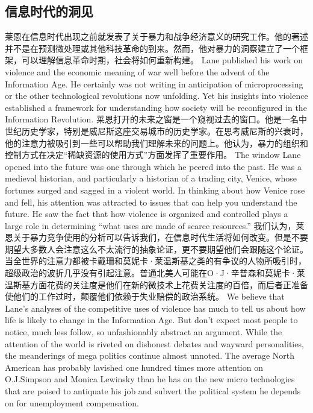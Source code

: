 \subsection{信息时代的洞见}
\begin{paracol}{2}
莱恩在信息时代出现之前就发表了关于暴力和战争经济意义的研究工作。他的著述并不是在预测微处理或其他科技革命的到来。然而，他对暴力的洞察建立了一个框架，可以理解信息革命时期，社会将如何重新构建。
\switchcolumn
Lane published his work on violence and the economic meaning of war well before the advent of the Information Age. He certainly was not writing in anticipation of microprocessing or the other technological revolutions now unfolding. Yet his insights into violence established a framework for understanding how society will be reconfigured in the Information Revolution.
\switchcolumn*
莱恩打开的未来之窗是一个窥视过去的窗口。他是一名中世纪历史学家，特别是威尼斯这座交易城市的历史学家。在思考威尼斯的兴衰时，他的注意力被吸引到一些可以帮助我们理解未来的问题上。他认为，暴力的组织和控制方式在决定“稀缺资源的使用方式”方面发挥了重要作用。
\switchcolumn
The window Lane opened into the future was one through which he peered into the past. He was a medieval historian, and particularly a historian of a trading city, Venice, whose fortunes surged and sagged in a violent world. In thinking about how Venice rose and fell, his attention was attracted to issues that can help you understand the future. He saw the fact that how violence is organized and controlled plays a large role in determining ``what uses are made of scarce resources.''
\switchcolumn*
我们认为，莱恩关于暴力竞争使用的分析可以告诉我们，在信息时代生活将如何改变。但是不要期望大多数人会注意这么不太流行的抽象论证，更不要期望他们会跟随这个论证。当全世界的注意力都被卡戴珊和莫妮卡·莱温斯基之类的有争议的人物所吸引时，超级政治的波折几乎没有引起注意。普通北美人可能在O·J·辛普森和莫妮卡·莱温斯基方面花费的关注度是他们在新的微技术上花费关注度的百倍，而后者正准备使他们的工作过时，颠覆他们依赖于失业赔偿的政治系统。
\switchcolumn
We believe that Lane's analyses of the competitive uses of violence has much to tell us about how life is likely to change in the Information Age. But don't expect most people to notice, much less follow, so unfashionably abstract an argument. While the attention of the world is riveted on dishonest debates and wayward personalities, the meanderings of mega politics continue almost unnoted. The average North American has probably lavished one hundred times more attention on O.J.Simpson and Monica Lewinsky than he has on the new micro technologies that are poised to antiquate his job and subvert the political system he depends on for unemployment compensation.
\end{paracol}

